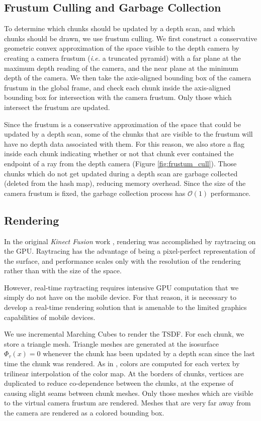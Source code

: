 \documentclass[10pt,twocolumn,letterpaper]{article}
\begin{document}
\subsection{Frustum Culling and Garbage Collection}
To determine which chunks should be updated by a depth scan, and which chunks
should be drawn, we use frustum culling. We first construct a conservative
geometric convex approximation of the space visible to the depth camera by
creating a camera frustum (\textit{i.e.} a truncated pyramid) with a far plane
at the maximum depth reading of the camera, and the near plane at the minimum
depth of the camera. We then take the axis-aligned bounding box of the camera
frustum in the global frame, and check each chunk inside the axis-aligned
bounding box for intersection with the camera frustum. Only those which
intersect the frustum are updated. 

Since the frustum is a conservative approximation of the space that could be
updated by a depth scan, some of the chunks that are visible to the frustum will
have no depth data associated with them. For this reason, we also store a flag
inside each chunk indicating whether or not that chunk ever contained the
endpoint of a ray from the depth camera (Figure \ref{fig:frustum_cull}). Those
chunks which do not get updated during a depth scan are garbage collected
(deleted from the hash map), reducing memory overhead. Since the size of the
camera frustum is fixed, the garbage collection process has $\mathcal{O}(1)$
performance.

\subsection{Rendering}
In the original \textit{Kinect Fusion} work \cite{Newcombe}, rendering was
accomplished by raytracing on the GPU. Raytracing has the advantage of being a
pixel-perfect representation of the surface, and performance scales only with
the resolution of the rendering rather than with the size of the space. 

However, real-time raytracting requires intensive GPU computation that we simply
do not have on the mobile device. For that reason, it is necessary to develop a
real-time rendering solution that is amenable to the limited graphics
capabilities of mobile devices.

We use incremental Marching Cubes \cite{Lorensen1987} to render the TSDF. For
each chunk, we store a triangle mesh. Triangle meshes are generated at the
isosurface $\Phi_{\tau}(x) = 0$ whenever the chunk has been updated by a depth
scan since the last time the chunk was rendered. As in \cite{Bylow2013,
Whelan2013},  colors are computed for each vertex by trilinear interpolation of
the color map. At the borders of chunks, vertices are duplicated to reduce
co-dependence between the chunks, at the expense of causing slight seams
between chunk meshes. Only those meshes which are visible to the virtual camera
frustum are rendered. Meshes that are very far away from the camera are
rendered as a colored bounding box.
\end{document}
